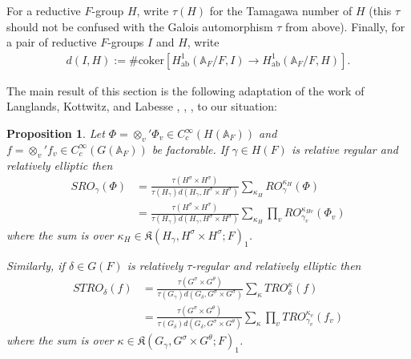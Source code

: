 \documentclass[12pt]{amsart}
\newtheorem{prop}[thm]{Proposition}
\theoremstyle{remark}
\numberwithin{equation}{section}
\newcommand{\A}{\mathbb{A}}
\theoremstyle{definition}
\numberwithin{equation}{subsection}
\begin{document}
For a reductive $F$-group $H$, write $\tau(H)$ for the Tamagawa number of $H$ (this
$\tau$ should not be confused with the Galois automorphism $\tau$ from above).  Finally, for a pair of reductive $F$-groups $I$ and $H$, write
\begin{align}
d(I,H):=\# \mathrm{coker}\left[H^1_{\mathrm{ab}}(\A_F/F,I) \to H^1_{\mathrm{ab}}(\A_F/F,H)\right].
\end{align} 

\noindent
The main result of this section is the following adaptation of the work of Langlands, Kottwitz, and Labesse
\cite{LanglStab}, \cite{KottStCusp},
\cite{KottEllSing}, \cite{Lab} to our situation:

\begin{prop} \label{prop-prestab} Let $\Phi=\otimes_v'\Phi_v \in C_c^{\infty}(H(\A_F))$ and $f=\otimes_v'f_v \in C_c^{\infty}({G}(\A_F))$ be factorable.
If $\gamma \in H(F)$ is relative regular and relatively elliptic then
\begin{align*}
SRO_{\gamma}(\Phi)&= \frac{\tau(H^{\sigma} \times H^{\sigma})}{\tau(H_{\gamma}) d(H_{\gamma},H^{\sigma}\times H^{\sigma})}
\sum_{\kappa_H}RO^{\kappa_H}_{\gamma}(\Phi)\\
&=\frac{\tau(H^{\sigma} \times H^{\sigma})}{\tau(H_{\gamma}) d(H_{\gamma},H^{\sigma}\times H^{\sigma})}
\sum_{\kappa_H}\prod_{v} RO^{\kappa_{Hv}}_{\gamma_v}(\Phi_v)
\end{align*}
where the sum is over $\kappa_H \in \mathfrak{K}(H_{\gamma},H^{\sigma} \times H^{\sigma};F)_1$.

Similarly, if $\delta \in {G}(F)$ is relatively $\tau$-regular and relatively elliptic then
\begin{align*}
STRO_{\delta}(f)&= \frac{\tau({G}^{\sigma}\times G^{\theta})}{\tau(G_{\gamma})
  d(G_{\delta} ,G^{\sigma} \times G^{\sigma})}
\sum_{\kappa}TRO^{\kappa}_{\delta}(f)\\
&=\frac{\tau({G}^{\sigma} \times G^{\theta})}{\tau(G_{\delta}) d(G_{\delta},{G}^{\sigma}\times G^{\theta})}
\sum_{\kappa}\prod_{v} TRO^{\kappa_v}_{\gamma_v}(f_v)
\end{align*}
where the sum is over
$\kappa \in \mathfrak{K}({G}_{\gamma},{G}^{\sigma} \times {G}^{\theta};F)_1$.
\end{prop}
\end{document}
